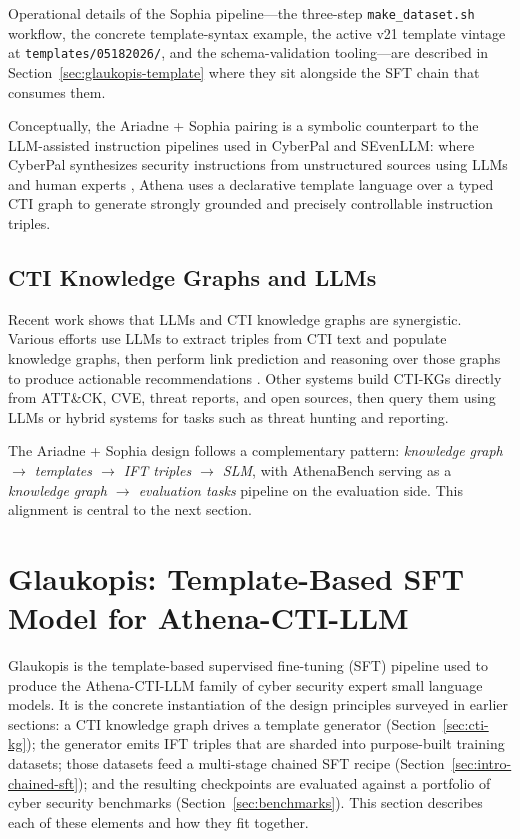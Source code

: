 \documentclass[unnumsec,webpdf,contemporary,large]{oup-authoring-template}
\theoremstyle{thmstyleone}
\theoremstyle{thmstyletwo}
\theoremstyle{thmstylethree}
\begin{document}
Operational details of the Sophia pipeline---the three-step \texttt{make\_dataset.sh} workflow, the concrete template-syntax example, the active v21 template vintage at \texttt{templates/05182026/}, and the schema-validation tooling---are described in Section~\ref{sec:glaukopis-template} where they sit alongside the SFT chain that consumes them.

Conceptually, the Ariadne + Sophia pairing is a symbolic counterpart to the LLM-assisted instruction pipelines used in CyberPal and SEvenLLM: where CyberPal synthesizes security instructions from unstructured sources using LLMs and human experts \cite{levi2024cyberpal,levi2025toward}, Athena uses a declarative template language over a typed CTI graph to generate strongly grounded and precisely controllable instruction triples.

\subsection{CTI Knowledge Graphs and LLMs}
\label{sec:cti-kg-llms}

Recent work shows that LLMs and CTI knowledge graphs are synergistic. Various efforts use LLMs to extract triples from CTI text and populate knowledge graphs, then perform link prediction and reasoning over those graphs to produce actionable recommendations \cite{fieblinger2024kg,zhang2023cyberkg,wu2022opencykg,yu2024ctikg,zhao2024kctiaa}. Other systems build CTI-KGs directly from ATT\&CK, CVE, threat reports, and open sources, then query them using LLMs or hybrid systems for tasks such as threat hunting and reporting.

The Ariadne + Sophia design follows a complementary pattern: \emph{knowledge graph $\rightarrow$ templates $\rightarrow$ IFT triples $\rightarrow$ SLM}, with AthenaBench serving as a \emph{knowledge graph $\rightarrow$ evaluation tasks} pipeline on the evaluation side. This alignment is central to the next section.

\section{Glaukopis: Template-Based SFT Model for Athena-CTI-LLM}
\label{sec:glaukopis}

Glaukopis is the template-based supervised fine-tuning (SFT) pipeline used to produce the Athena-CTI-LLM family of cyber security expert small language models. It is the concrete instantiation of the design principles surveyed in earlier sections: a CTI knowledge graph drives a template generator (Section~\ref{sec:cti-kg}); the generator emits IFT triples that are sharded into purpose-built training datasets; those datasets feed a multi-stage chained SFT recipe (Section~\ref{sec:intro-chained-sft}); and the resulting checkpoints are evaluated against a portfolio of cyber security benchmarks (Section~\ref{sec:benchmarks}). This section describes each of these elements and how they fit together.
\end{document}
